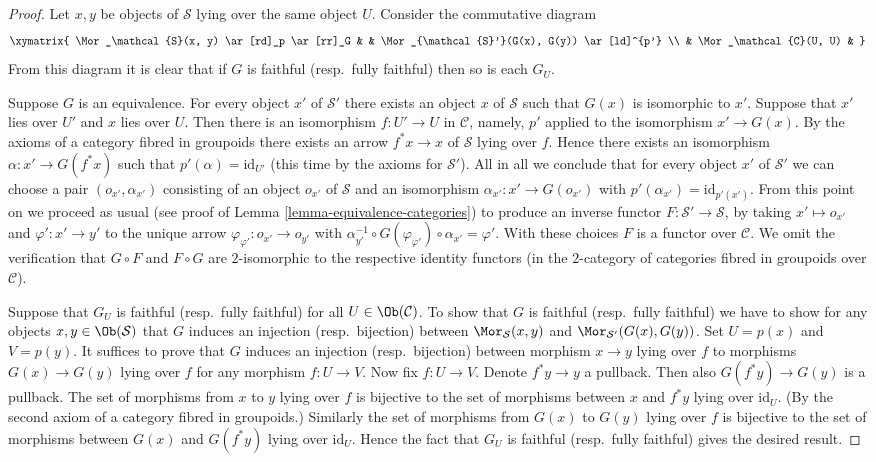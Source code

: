 \begin{proof}
Let $x, y$ be objects of $\mathcal{S}$ lying over the same object $U$.
Consider the commutative diagram
$$
\xymatrix{
\Mor_\mathcal{S}(x, y) \ar[rd]_p \ar[rr]_G & &
\Mor_{\mathcal{S}'}(G(x), G(y)) \ar[ld]^{p'} \\
& \Mor_\mathcal{C}(U, U) &
}
$$
From this diagram it is clear that if $G$ is faithful (resp.\ fully faithful)
then so is each $G_U$.

\medskip\noindent
Suppose $G$ is an equivalence. For every object
$x'$ of $\mathcal{S}'$ there exists an object $x$ of $\mathcal{S}$
such that $G(x)$ is isomorphic to $x'$. Suppose that $x'$ lies
over $U'$ and $x$ lies over $U$. Then there is an isomorphism
$f : U' \to U$ in $\mathcal{C}$, namely, $p'$ applied to the
isomorphism $x' \to G(x)$. By the axioms of a category fibred
in groupoids there exists an arrow $f^*x \to x$ of $\mathcal{S}$
lying over $f$. Hence there exists an isomorphism
$\alpha : x' \to G(f^*x)$ such that $p'(\alpha) = \text{id}_{U'}$
(this time by the axioms for $\mathcal{S}'$). All in all we conclude
that for every object $x'$ of $\mathcal{S}'$ we can choose
a pair $(o_{x'}, \alpha_{x'})$ consisting of an object
$o_{x'}$ of $\mathcal{S}$ and an isomorphism $\alpha_{x'} : x' \to G(o_{x'})$
with $p'(\alpha_{x'}) = \text{id}_{p'(x')}$.
From this point on we proceed as usual (see proof of
Lemma \ref{lemma-equivalence-categories}) to produce an inverse
functor $F : \mathcal{S}' \to \mathcal{S}$, by taking
$x' \mapsto o_{x'}$ and $\varphi' : x' \to y'$ to the unique
arrow $\varphi_{\varphi'} : o_{x'} \to o_{y'}$ with
$\alpha_{y'}^{-1} \circ G(\varphi_{\varphi'}) \circ \alpha_{x'} = \varphi'$.
With these choices $F$ is a functor over $\mathcal{C}$.
We omit the verification that $G \circ F$ and $F \circ G$ are
$2$-isomorphic to the respective identity functors
(in the $2$-category of categories fibred in groupoids over $\mathcal{C}$).

\medskip\noindent
Suppose that $G_U$ is faithful (resp.\ fully faithful)
for all $U\in\Ob(\mathcal C)$. To
show that $G$ is faithful (resp.\ fully faithful)
we have to show for any objects
$x, y\in\Ob(\mathcal{S})$ that $G$ induces an
injection (resp.\ bijection) between
$\Mor_\mathcal{S}(x, y)$ and
$\Mor_{\mathcal{S}'}(G(x), G(y))$.
Set $U = p(x)$ and $V = p(y)$.
It suffices to prove that $G$
induces an injection (resp.\ bijection) between morphism
$x \to y$ lying over $f$ to morphisms $G(x) \to G(y)$ lying over $f$
for any morphism $f : U \to V$.
Now fix $f : U \to V$. Denote $f^*y \to y$ a pullback.
Then also $G(f^*y) \to G(y)$ is a pullback.
The set of morphisms from $x$ to $y$ lying over $f$
is bijective to the set of morphisms between
$x$ and $f^*y$ lying over $\text{id}_U$. (By the second axiom
of a category fibred in groupoids.) Similarly
the set of morphisms from $G(x)$ to $G(y)$ lying over $f$
is bijective to the set of morphisms between
$G(x)$ and $G(f^*y)$ lying over $\text{id}_U$.
Hence the fact that $G_U$ is faithful (resp.\ fully faithful)
gives the desired result.


\end{proof}
